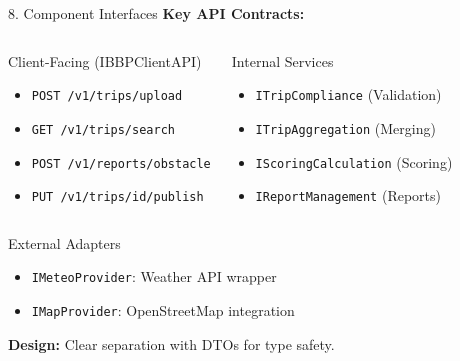 \documentclass[aspectratio=169, 10pt]{beamer}
\begin{document}
\begin{frame}{8. Component Interfaces}
    \textbf{Key API Contracts:}
    
    \vspace{0.3cm}
    \begin{columns}[T]
        \begin{block}{Client-Facing (IBBPClientAPI)}
            \begin{itemize}
                \item \texttt{POST /v1/trips/upload}
                \item \texttt{GET /v1/trips/search}
                \item \texttt{POST /v1/reports/obstacle}
                \item \texttt{PUT /v1/trips/{id}/publish}
            \end{itemize}
        \end{block}
        
        \begin{block}{Internal Services}
            \begin{itemize}
                \item \texttt{ITripCompliance} (Validation)
                \item \texttt{ITripAggregation} (Merging)
                \item \texttt{IScoringCalculation} (Scoring)
                \item \texttt{IReportManagement} (Reports)
            \end{itemize}
        \end{block}
    \end{columns}
    
    \vspace{0.3cm}
    \begin{block}{External Adapters}
        \begin{itemize}
            \item \texttt{IMeteoProvider}: Weather API wrapper
            \item \texttt{IMapProvider}: OpenStreetMap integration
        \end{itemize}
    \end{block}
    
    \vspace{0.2cm}
    \textbf{Design:} Clear separation with DTOs for type safety.
\end{frame}
\end{document}
